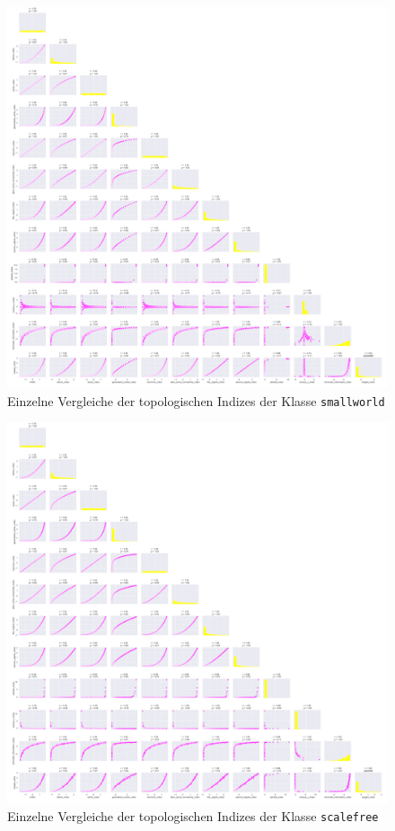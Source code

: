 \begin{figure}[H]
    \centering
    \includegraphics[width=1.2\textwidth]{images/30_results/smallworld-correlation-pairs.png}
    \caption{Einzelne Vergleiche der topologischen Indizes der Klasse \texttt{smallworld}}
    \label{fig:correlation-pairs-smallworld}
\end{figure}

\begin{figure}[H]
    \centering
    \includegraphics[width=1.2\textwidth]{images/30_results/scalefree-correlation-pairs.png}
    \caption{Einzelne Vergleiche der topologischen Indizes der Klasse \texttt{scalefree}}
    \label{fig:correlation-pairs-scalefree}
\end{figure}

